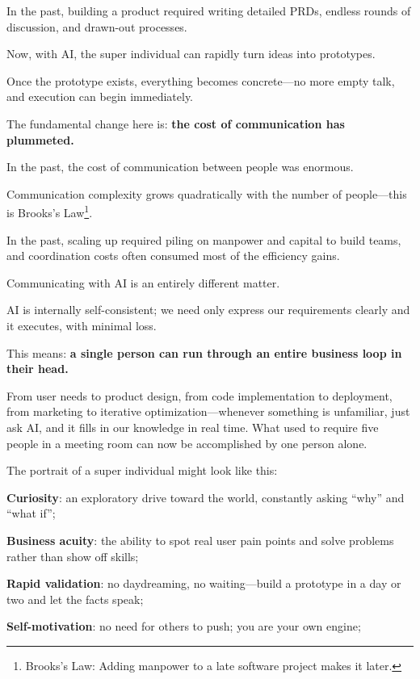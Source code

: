 In the past, building a product required writing detailed PRDs, endless rounds of discussion, and drawn-out processes.

Now, with AI, the super individual can rapidly turn ideas into prototypes.

Once the prototype exists, everything becomes concrete---no more empty talk, and execution can begin immediately.

The fundamental change here is: \textbf{the cost of communication has plummeted.}

\vspace{1em}

In the past, the cost of communication between people was enormous.

Communication complexity grows quadratically with the number of people---this is Brooks's Law\footnote{Brooks's Law: Adding manpower to a late software project makes it later.}.

In the past, scaling up required piling on manpower and capital to build teams, and coordination costs often consumed most of the efficiency gains.

Communicating with AI is an entirely different matter.

AI is internally self-consistent; we need only express our requirements clearly and it executes, with minimal loss.

This means: \textbf{a single person can run through an entire business loop in their head.}

From user needs to product design, from code implementation to deployment, from marketing to iterative optimization---whenever something is unfamiliar, just ask AI, and it fills in our knowledge in real time. What used to require five people in a meeting room can now be accomplished by one person alone.

\vspace{1em}

The portrait of a super individual might look like this:

\textbf{Curiosity}: an exploratory drive toward the world, constantly asking ``why'' and ``what if'';

\textbf{Business acuity}: the ability to spot real user pain points and solve problems rather than show off skills;

\textbf{Rapid validation}: no daydreaming, no waiting---build a prototype in a day or two and let the facts speak;

\textbf{Self-motivation}: no need for others to push; you are your own engine;

